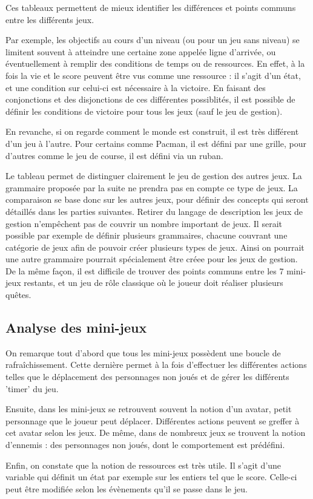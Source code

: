 \vspace{0.5cm}

Ces tableaux permettent de mieux identifier les différences et points communs entre les différents jeux.

Par exemple, les objectifs au cours d'un niveau (ou pour un jeu sans niveau) se limitent souvent à atteindre une certaine zone
appelée ligne d'arrivée, ou éventuellement à remplir des conditions de temps ou de ressources. En effet, à la fois la vie et le score
peuvent être vus comme une ressource : il s'agit d'un état, et une condition sur celui-ci est nécessaire à la victoire.
En faisant des conjonctions et des disjonctions de ces différentes possiblités, il est possible de définir 
les conditions de victoire pour tous les jeux (sauf le jeu de gestion).

En revanche, si on regarde comment le monde est construit, il est très différent d'un jeu à l'autre.
Pour certains comme Pacman, il est défini par une grille, pour d'autres comme le jeu de course, il est défini via un ruban.

Le tableau permet de distinguer clairement le jeu de gestion des autres jeux.
La grammaire proposée par la suite ne prendra pas en compte ce type de jeux.
La comparaison se base donc sur les autres jeux, pour définir des concepts qui seront détaillés dans les parties suivantes.
Retirer du langage de description les jeux de gestion n'empêchent pas de couvrir un nombre important de jeux.
Il serait possible par exemple de définir plusieurs grammaires, chacune couvrant une catégorie de jeux afin de pouvoir
créer plusieurs types de jeux. Ainsi on pourrait une autre grammaire pourrait spécialement être créee pour les jeux de gestion.
De la même façon, il est difficile de trouver des points communs entre les 7 mini-jeux restants, et un jeu de rôle classique où le joueur
doit réaliser plusieurs quêtes.

\subsection{Analyse des mini-jeux}

On remarque tout d'abord que tous les mini-jeux possèdent une boucle de rafraîchissement.
Cette dernière permet à la fois d'effectuer les différentes actions telles que le déplacement des personnages non joués et de gérer 
les différents 'timer' du jeu.

Ensuite, dans les mini-jeux se retrouvent souvent la notion d'un avatar, petit personnage que le joueur peut déplacer.
Différentes actions peuvent se greffer à cet avatar selon les jeux.
De même, dans de nombreux jeux se trouvent la notion d'ennemis : des personnages non joués, dont le comportement est prédéfini.

Enfin, on constate que la notion de ressources est très utile. Il s'agit d'une variable qui définit un état par exemple sur les entiers tel que le score.
Celle-ci peut être modifiée selon les évènements qu'il se passe dans le jeu.

